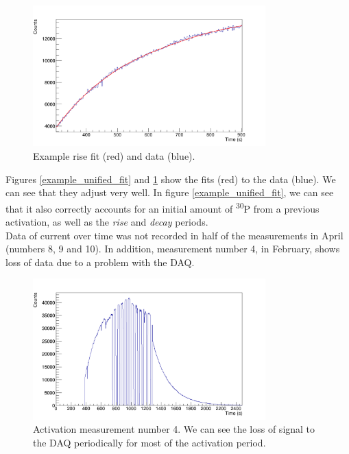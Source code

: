 \documentclass[a4paper,12pt]{report}
\newcommand{\Piso}{\textsuperscript{30}P }
\begin{document}
\begin{figure}[H]
	\centering
	\includegraphics[width=0.80\textwidth]{example_rise_fit.png}
	\caption{Example rise fit (red) and data (blue).}
	\label{example_rise_fit}
\end{figure}

Figures \ref{example_unified_fit} and \ref{example_rise_fit} show the fits (red) to the data (blue).
We can see that they adjust very well.
In figure \ref{example_unified_fit}, we can see that it also correctly accounts for an initial amount of \Piso from a previous activation, as well as the \textit{rise} and \textit{decay} periods.
\\

Data of current over time was not recorded in half of the measurements in April (numbers 8, 9 and 10).	%
In addition, measurement number 4, in February, shows loss of data due to a problem with the DAQ.

\begin{figure}[H]
	\centering
	\includegraphics[width=0.80\textwidth]{activation_4_time.png}
	\caption{Activation measurement number 4.
	We can see the loss of signal to the DAQ periodically for most of the activation period.}
	\label{activation_4_time}
\end{figure}
\end{document}
